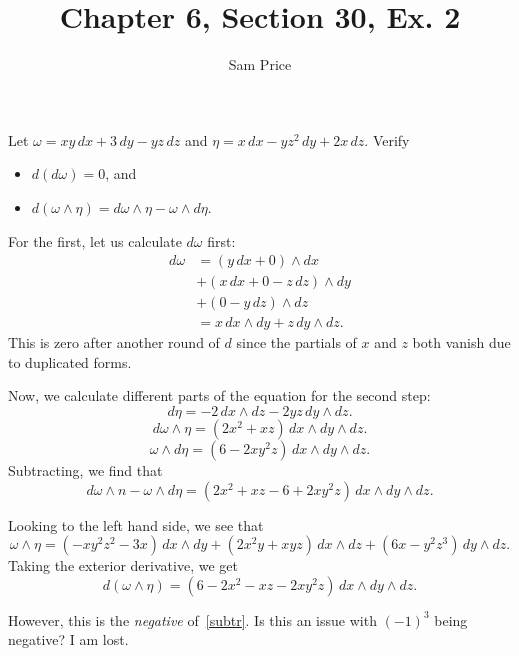 \documentclass{article}
\author{Sam Price}
\title{Chapter 6, Section 30, Ex. 2}
\begin{document}
\maketitle

Let $\omega = xy \,dx + 3 \,dy - yz \,dz$ and $\eta = x \,dx - yz^{2}\,dy + 2x \,dz$.
Verify
\begin{itemize}
  \item $d(d\omega) = 0$, and
  \item $d(\omega \wedge \eta) = d\omega \wedge \eta - \omega \wedge d\eta$.
\end{itemize}

For the first, let us calculate $d\omega$ first:
\begin{align*}
  d\omega &= (y\, dx + 0) \wedge dx\\
  &+ (x\, dx + 0 - z\, dz) \wedge dy\\
  &+ (0 - y\, dz) \wedge dz\\
  &= x\, dx \wedge dy + z\, dy \wedge dz.
\end{align*}
This is zero after another round of $d$ since the partials of $x$ and $z$
both vanish due to duplicated forms.

Now, we calculate different parts of the equation for the second step:
\[ d\eta = -2\,dx \wedge dz - 2yz\,dy\wedge dz. \]
\[ d\omega \wedge \eta = (2x^{2} + xz)\, dx\wedge dy\wedge dz. \]
\[ \omega \wedge d\eta = (6 - 2xy^{2}z)\,dx\wedge dy\wedge dz. \]
Subtracting, we find that
\begin{equation}\label{subtr}
  d\omega \wedge n - \omega \wedge d\eta = (2x^{2} + xz - 6 + 2xy^{2}z) \, dx\wedge dy\wedge dz.
\end{equation}

Looking to the left hand side, we see that
\[
  \omega \wedge \eta = (-xy^{2}z^{2} - 3x) \, dx \wedge dy
  + (2x^{2}y + xyz) \, dx \wedge dz
  + (6x - y^{2}z^{3}) \, dy\wedge dz.
\]
Taking the exterior derivative, we get
\[ d(\omega \wedge \eta) = (6 - 2x^{2} - xz - 2xy^{2}z) \, dx\wedge dy\wedge dz. \]

However, this is the \emph{negative} of~\eqref{subtr}.
Is this an issue with $(-1)^{3}$ being negative? I am lost.
\end{document}
